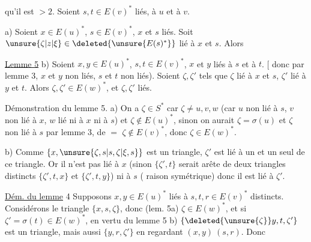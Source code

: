 
qu'il est $>2$. Soient  $s,t\in E(v)^*$ liés,  à $u$ et à $v$.

a) Soient $x\in E(u)^*$, $s\in E(v)^*$, $x$ et $s$ liés. Soit $\unsure{\zeta|z|\xi}\in\deleted{\unsure{E(s)^*}}$ lié à $x$ et $s$. Alors 

\uline{Lemme 5} b) Soient $x,y\in E(u)^*$, $s,t\in E(v)^*$, $x$ et $y$ liés  à $s$ et à $t$. [ donc par lemme 3, $x$ et $y$ non liés, $s$ et $t$ non liés).  Soient $\zeta,\zeta'$  tels que  $\zeta$ lié à $x$ et $s$, $\zeta'$ lié à $y$ et $t$. Alors $\zeta,\zeta'\in E(w)^*$, et $\zeta,\zeta'$ liés.

Démonstration du lemme 5.  a) On a $\zeta\in S^*$ car $\zeta\ne u,v,w$ (car $u$ non lié à $s$, $v$ non lié à $x$, $w$ lié ni à $x$ ni à $s$) et $\zeta\notin E(u)^*$, sinon on aurait $\zeta=\sigma(u)$ et $\zeta$ \deleted{\unsure{$\zeta$}} non lié à $s$ par lemme 3, de $=$ $\zeta\notin E(v)^*$, donc $\zeta\in E(w)^*$.

b) Comme $\{x,\unsure{\zeta,s|s,\zeta|\xi,s}\}$ est un triangle, $\zeta'$ est lié à un  et un seul de ce triangle. Or il n'est pas lié à $x$ (sinon $\{\zeta',t\}$ serait arête de deux triangles distincts $\{\zeta',t,x\}$ et $\{\zeta',t,y\}$) ni à $s$ ( raison symétrique) donc il est lié à $\zeta'$.


\uline{Dém. du lemme} 4 Supposons $x,y\in E(u)^*$  liés à $s,t,r\in E(v)^*$ distincts. Considérons le triangle $\{x,s,\zeta\}$, donc (lem. 5a) $\zeta\in E(w)^*$, et si $\zeta'=\sigma(t)\in E(w)^*$, en vertu du lemme 5 b)  $\{\deleted{\unsure{\zeta}}y,t,\zeta'\}$ est un triangle, mais aussi $\{y,r,\zeta'\}$ en regardant $(x,y)\ (s,r)$. Donc

